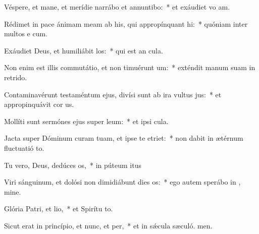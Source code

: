 \item Véspere, et mane, et merídie narrábo et annuntibo:~* et exáudiet vo am.
\item Rédimet in pace ánimam meam ab his, qui appropínquant hi:~* quóniam inter multos e cum.
\item Exáudiet Deus, et humiliábit los:~* qui est an cula.
\item Non enim est illis commutátio, et non timuérunt um:~* exténdit manum suam in retrido.
\item Contaminavérunt testaméntum ejus, divísi sunt ab ira vultus jus:~* et appropinquávit cor us.
\item Mollíti sunt sermónes ejus super leum:~* et ipsi  cula.
\item Jacta super Dóminum curam tuam, et ipse te etriet:~* non dabit in ætérnum fluctuatió to.
\item Tu vero, Deus, dedúces os,~* in púteum itus
\item Viri sánguinum, et dolósi non dimidiábunt dies os:~* ego autem sperábo in , mine.
\item Glória Patri, et lio,~* et Spirítu to.
\item Sicut erat in princípio, et nunc, et per,~* et in sǽcula sæculó. men.

